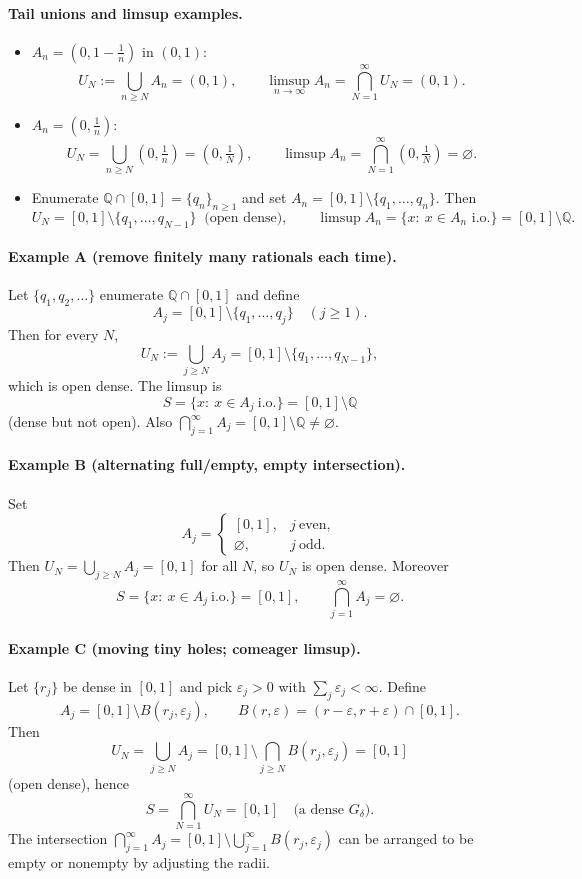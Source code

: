 \documentclass[11pt,a4paper]{article}
\theoremstyle{definition}
\theoremstyle{definition}
\theoremstyle{plain}
\theoremstyle{remark}
\begin{document}
\paragraph{Tail unions and limsup examples.}
\begin{itemize}
	\item $A_n=(0,1-\tfrac1n)$ in $(0,1)$:
	\[
	U_N:=\bigcup_{n\ge N}A_n=(0,1),\qquad
	\limsup_{n\to\infty}A_n=\bigcap_{N=1}^{\infty}U_N=(0,1).
	\]
	\item $A_n=(0,\tfrac1n)$:
	\[
	U_N=\bigcup_{n\ge N}(0,\tfrac1n)=(0,\tfrac1N),\qquad
	\limsup A_n=\bigcap_{N=1}^\infty(0,\tfrac1N)=\varnothing.
	\]
	\item Enumerate $\mathbb Q\cap[0,1]=\{q_n\}_{n\ge1}$ and set
	$A_n=[0,1]\setminus\{q_1,\dots,q_n\}$. Then
	\[
	U_N=[0,1]\setminus\{q_1,\dots,q_{N-1}\}\ \text{ (open dense)},\qquad
	\limsup A_n=\{x:\ x\in A_n\text{ i.o.}\}=[0,1]\setminus\mathbb Q.
	\]
\end{itemize}


\paragraph{Example A (remove finitely many rationals each time).}
Let $\{q_1,q_2,\dots\}$ enumerate $\mathbb Q\cap[0,1]$ and define
\[
A_j=[0,1]\setminus\{q_1,\dots,q_j\}\quad(j\ge1).
\]
Then for every $N$,
\[
U_N:=\bigcup_{j\ge N}A_j=[0,1]\setminus\{q_1,\dots,q_{N-1}\},
\]
which is open dense. The limsup is
\[
S=\{x:\ x\in A_j\ \text{i.o.}\}=[0,1]\setminus\mathbb Q
\]
(dense but not open). Also $\displaystyle \bigcap_{j=1}^\infty A_j=[0,1]\setminus\mathbb Q\neq\varnothing$.

\paragraph{Example B (alternating full/empty, empty intersection).}
Set
\[
A_j=\begin{cases}
	[0,1], & j\ \text{even},\\
	\varnothing, & j\ \text{odd}.
\end{cases}
\]
Then $U_N=\bigcup_{j\ge N}A_j=[0,1]$ for all $N$, so $U_N$ is open dense. Moreover
\[
S=\{x:\ x\in A_j\ \text{i.o.}\}=[0,1],
\qquad
\bigcap_{j=1}^\infty A_j=\varnothing.
\]

\paragraph{Example C (moving tiny holes; comeager limsup).}
Let $\{r_j\}$ be dense in $[0,1]$ and pick $\varepsilon_j>0$ with $\sum_j \varepsilon_j<\infty$.
Define
\[
A_j=[0,1]\setminus B(r_j,\varepsilon_j),\qquad B(r,\varepsilon)=(r-\varepsilon,r+\varepsilon)\cap[0,1].
\]
Then
\[
U_N=\bigcup_{j\ge N}A_j=[0,1]\setminus\bigcap_{j\ge N}B(r_j,\varepsilon_j)=[0,1]
\]
(open dense), hence
\[
S=\bigcap_{N=1}^\infty U_N=[0,1]\quad\text{(a dense $G_\delta$)}.
\]
The intersection $\displaystyle\bigcap_{j=1}^\infty A_j=[0,1]\setminus\bigcup_{j=1}^\infty B(r_j,\varepsilon_j)$
can be arranged to be empty or nonempty by adjusting the radii.
\end{document}
